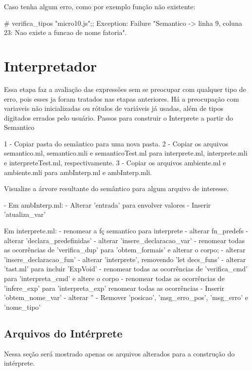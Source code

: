 \documentclass[12pt,a4paper,twoside]{article}
\begin{document}
Caso tenha algum erro, como por exemplo função não existente:
\begin{terminal}
# verifica_tipos "micro10.js";;
Exception:
Failure
 "Semantico -> linha 9, coluna 23: Nao existe a funcao de nome fatoria".
\end{terminal}

\section{Interpretador}
Essa etapa faz a avaliação das expressões sem se preocupar com qualquer tipo de erro, pois esses ja foram tratados nas etapas anteriores. Há a preocupação com variaveis não inicializadas ou rótulos de variáveis já usadas, além de tipos digitados errados pelo usuário.\newline\newline
Passos para construir o Interprete a partir do Semantico
\begin{terminal}
1 - Copiar pasta do semântico para uma nova pasta.
2 - Copiar os arquivos semantico.ml, semantico.mli e semanticoTest.ml para interprete.ml, interprete.mli e interpreteTest.ml, respectivamente.
3 - Copiar os arquivos ambiente.ml e ambiente.mli para ambInterp.ml e ambInterp.mli.

Visualize a árvore resultante do semântico para algum arquivo de interesse.

- Em ambInterp.ml:
  - Alterar 'entrada' para envolver valores
  - Inserir 'atualiza_var'

Em interprete.ml:
  - renomear a fç semantico para interprete
  - alterar fn_predefs
  - alterar 'declara_predefinidas'
  - alterar 'insere_declaracao_var'
  - renomear todas as ocorrências de 'verifica_dup' para 'obtem_formais' e alterar o corpo;
  - alterar 'insere_declaracao_fun'
  - alterar 'interprete', removendo 'let decs_funs'
  - alterar 'tast.ml' para incluir 'ExpVoid'
  - renomear todas as ocorrências de 'verifica_cmd' para 'interpreta_cmd' e altere o corpo
  - renomear todas as ocorrências de 'infere_exp' para 'interpreta_exp' renomear todas as ocorrências
  - Inserir 'obtem_nome_var'
  - alterar ''
  - Remover 'posicao', 'msg_erro_pos', 'msg_erro' e 'nome_tipo'
\end{terminal}

\subsection{Arquivos do Intérprete}
Nessa seção será mostrado apenas os arquivos alterados para a construção do intérprete.
\end{document}
